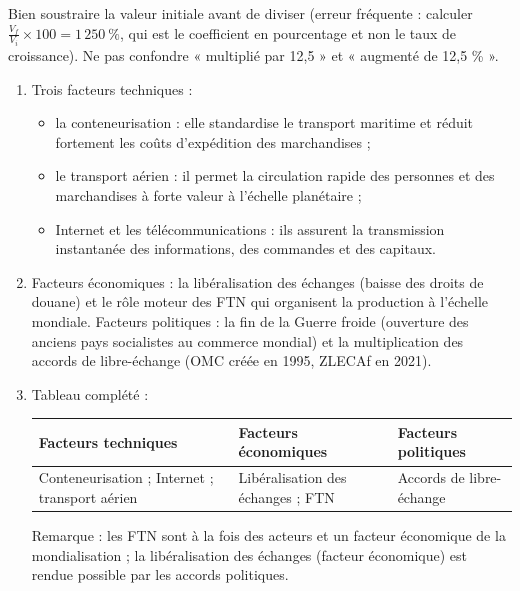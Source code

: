 \documentclass[11pt]{article}
\newcommand{\cle}[1]{{\popxbold\color{popdark}#1}}
\begin{document}
\begin{attention}
Bien soustraire la valeur initiale avant de diviser (erreur fréquente : calculer $\frac{V_f}{V_i}\times 100 = 1\,250\ \%$, qui est le coefficient en pourcentage et non le taux de croissance). Ne pas confondre « multiplié par 12,5 » et « augmenté de 12,5 \% ».
\end{attention}

\begin{corrige}
\begin{enumerate}
\item Trois facteurs techniques :
\begin{itemize}
\item la \cle{conteneurisation} : elle standardise le transport maritime et réduit fortement les coûts d'expédition des marchandises ;
\item le \cle{transport aérien} : il permet la circulation rapide des personnes et des marchandises à forte valeur à l'échelle planétaire ;
\item \cle{Internet} et les télécommunications : ils assurent la transmission instantanée des informations, des commandes et des capitaux.
\end{itemize}
\item Facteurs économiques : la \cle{libéralisation des échanges} (baisse des droits de douane) et le rôle moteur des \cle{FTN} qui organisent la production à l'échelle mondiale. Facteurs politiques : la fin de la Guerre froide (ouverture des anciens pays socialistes au commerce mondial) et la multiplication des \cle{accords de libre-échange} (OMC créée en 1995, ZLECAf en 2021).
\item Tableau complété :
\begin{center}
\begin{tabularx}{\linewidth}{|X|X|X|}
\hline
\rowcolor{popblueL} Facteurs techniques & Facteurs économiques & Facteurs politiques \\
\hline
Conteneurisation ; Internet ; transport aérien & Libéralisation des échanges ; FTN & Accords de libre-échange \\
\hline
\end{tabularx}
\end{center}
Remarque : les FTN sont à la fois des acteurs et un facteur économique de la mondialisation ; la libéralisation des échanges (facteur économique) est rendue possible par les accords politiques.
\end{enumerate}
\end{corrige}
\end{document}
